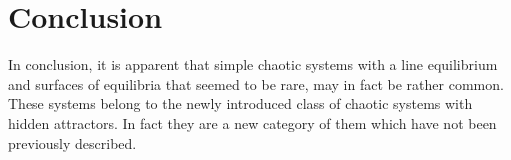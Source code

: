 \section{Conclusion}

In conclusion, it is apparent that simple chaotic systems
with a line equilibrium and surfaces of equilibria that seemed
to be rare, may in fact
be rather common. These systems belong to the newly
introduced class of chaotic systems with hidden attractors.
In fact they are a new category of them which have not
been previously described.



